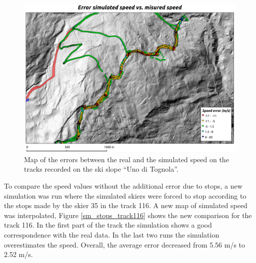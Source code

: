 \documentclass[12pt,a4paper,twoside]{book}
\begin{document}
\begin{figure}[!h]
  \centering
    \includegraphics[width=\textwidth]{images/map_error.eps}
    \caption{Map of the errors between the real and the simulated speed on the tracks recorded on the ski slope ``Uno di Tognola''.}\label{map_error}
\end{figure}

To compare the speed values without the additional error due to stops, a new simulation was run where the simulated skiers were forced to stop according to the stops made by the skier 35 in the track 116. A new map of simulated speed was interpolated, Figure \ref{sm_stops_track116} shows the new comparison for the track 116. In the first part of the track the simulation shows a good correspondence with the real data. In the last two runs the simulation overestimates the speed. Overall, the average error decreased from 5.56 m/s to 2.52 m/s.
\end{document}
